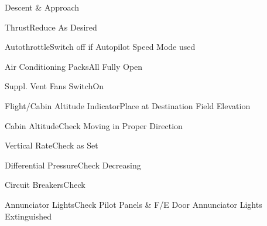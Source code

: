 \documentclass[sim-use, blue_items]{checklist}
\begin{document}
\begin{checklist}{Descent \& Approach}
	\item{Thrust}{Reduce As Desired}
	\item{Autothrottle}{Switch off if Autopilot Speed Mode used}
	\item{Air Conditioning Packs}{All Fully Open}
	\item{Suppl. Vent Fans Switch}{On}
	\item{Flight/Cabin Altitude Indicator}{Place at Destination Field Elevation}
	\item{Cabin Altitude}{Check Moving in Proper Direction}
	\item{Vertical Rate}{Check as Set}
	\item{Differential Pressure}{Check Decreasing}
	\item{Circuit Breakers}{Check}
	\item{Annunciator Lights}{Check Pilot Panels \& F/E Door Annunciator Lights Extinguished}
\end{checklist}
\end{document}

